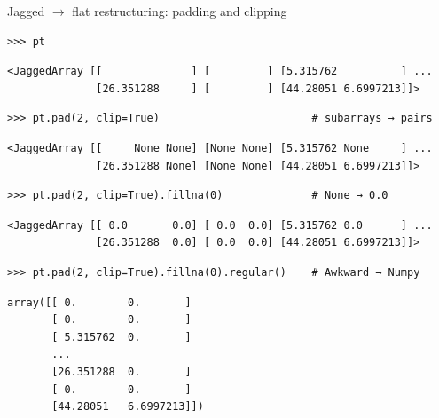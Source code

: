 \documentclass[aspectratio=169]{beamer}
\begin{document}
\begin{frame}[fragile]{Jagged $\to$ flat restructuring: padding and clipping}
\small
\begin{verbatim}
>>> pt
\end{verbatim}

\vspace{-0.45 cm}
\color{darkblue}\begin{verbatim}
<JaggedArray [[              ] [         ] [5.315762          ] ...
              [26.351288     ] [         ] [44.28051 6.6997213]]>
\end{verbatim}
\color{black}

\vspace{-0.5\baselineskip}
\begin{verbatim}
>>> pt.pad(2, clip=True)                        # subarrays → pairs
\end{verbatim}

\vspace{-0.45 cm}
\color{darkblue}\begin{verbatim}
<JaggedArray [[     None None] [None None] [5.315762 None     ] ...
              [26.351288 None] [None None] [44.28051 6.6997213]]>
\end{verbatim}
\color{black}

\vspace{-0.5\baselineskip}
\begin{verbatim}
>>> pt.pad(2, clip=True).fillna(0)              # None → 0.0
\end{verbatim}

\vspace{-0.45 cm}
\color{darkblue}\begin{verbatim}
<JaggedArray [[ 0.0       0.0] [ 0.0  0.0] [5.315762 0.0      ] ...
              [26.351288  0.0] [ 0.0  0.0] [44.28051 6.6997213]]>
\end{verbatim}
\color{black}

\vspace{-0.5\baselineskip}
\begin{verbatim}
>>> pt.pad(2, clip=True).fillna(0).regular()    # Awkward → Numpy
\end{verbatim}

\vspace{-0.45 cm}
\color{darkblue}\begin{verbatim}
array([[ 0.        0.       ]
       [ 0.        0.       ]
       [ 5.315762  0.       ]
       ...
       [26.351288  0.       ]
       [ 0.        0.       ]
       [44.28051   6.6997213]])
\end{verbatim}
\color{black}
\end{frame}
\end{document}
